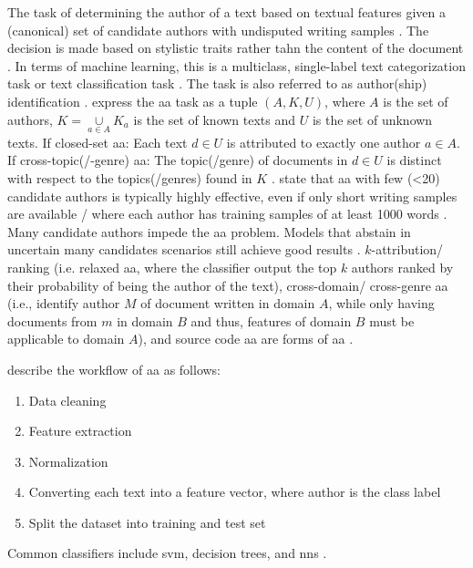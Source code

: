 \begin{definition}
    [\ac{aa}]   %
    The task of determining the author of a text based on textual features 
    given a (canonical) set of candidate authors with undisputed writing samples 
    \cite{stein_intrinsic_2011,stamatatos_survey_2009,tyo_state_2022,bischoff_importance_2020,barlas_cross_domain_2020,altakrori_topic_2021,bevendorff_divergence_based_2020,elmanarelbouanani_authorship_2014,abbasi_writeprints_2008,llm_detection_av_2025,neal_surveying_2018}.
    The decision is made based on stylistic traits rather tahn the content of the document \cite{neal_surveying_2018}.
    In terms of machine learning, this is a multiclass, single-label text categorization task \cite{stamatatos_survey_2009,elmanarelbouanani_authorship_2014} or text classification task \cite{elmanarelbouanani_authorship_2014}.
    The task is also referred to as author(ship) identification \cite{stamatatos_survey_2009,elmanarelbouanani_authorship_2014}.
    \citet{barlas_cross_domain_2020} express the \ac{aa} task as a tuple $(A,K,U)$, 
    where $A$ is the set of authors, $K=\underset{a\in A}{\cup}K_a$ is the set of known texts and $U$ is the set of unknown texts.
    If closed-set \ac{aa}: Each text $d \in U$ is attributed to exactly one author $a \in A$.
    If cross-topic(/-genre) \ac{aa}: The topic(/genre) of documents in $d \in U$ is distinct 
    with respect to the topics(/genres) found in $K$ \cite{barlas_cross_domain_2020}. 
    \citet{llm_detection_av_2025,neal_surveying_2018} state that \ac{aa} with few (<20) candidate authors is typically highly effective, 
    even if only short writing samples are available \cite{llm_detection_av_2025}/ 
    where each author has training samples of at least 1000 words \cite{neal_surveying_2018}.
    Many candidate authors impede the \ac{aa} problem.
    Models that abstain in uncertain many candidates scenarios still achieve good results \cite{llm_detection_av_2025}.
    $k$-attribution/ ranking (i.e. relaxed \ac{aa}, where the classifier output the top $k$ authors ranked by their probability of being the author of the text), 
    cross-domain/ cross-genre \ac{aa} (i.e., identify author $M$ of document written in domain $A$, while only having documents from $m$ in domain $B$ and thus, 
    features of domain $B$ must be applicable to domain $A$), 
    and source code \ac{aa} 
    are forms of \ac{aa} \cite{neal_surveying_2018}.
\end{definition}

\citet{elmanarelbouanani_authorship_2014} describe the workflow of \ac{aa} as follows:
\begin{enumerate}
    \item Data cleaning
    \item Feature extraction
    \item Normalization
    \item Converting each text into a feature vector, where author is the class label
    \item Split the dataset into training and test set
\end{enumerate}
Common classifiers include \ac{svm}, decision trees, and \acp{nn} \cite{elmanarelbouanani_authorship_2014}.

